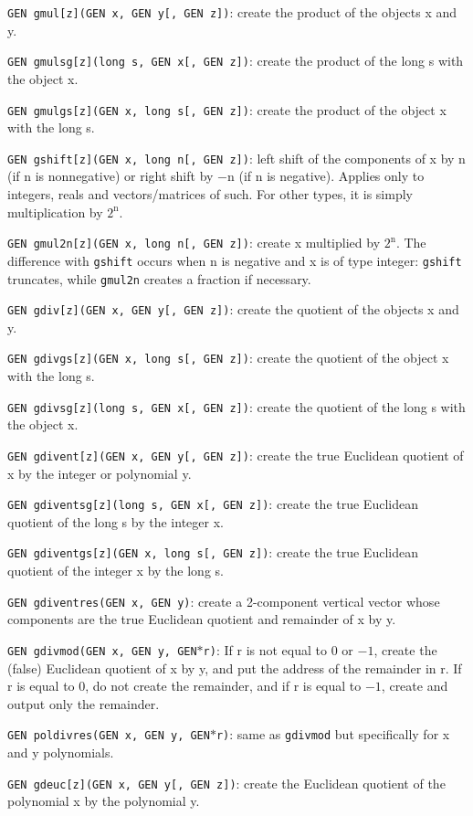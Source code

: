 {\tt GEN gmul[z](GEN x, GEN y[, GEN z])}: create the product of the objects x 
and y.

{\tt GEN gmulsg[z](long s, GEN x[, GEN z])}: create the product of the long s 
with the object x.

{\tt GEN gmulgs[z](GEN x, long s[, GEN z])}: create the product of the object
x with the long s.

{\tt GEN gshift[z](GEN x, long n[, GEN z])}: left shift of the components of
x by n (if n is nonnegative) or right shift by $-$n (if n is negative). Applies
only to integers, reals and vectors/matrices of such. For other types, it is 
simply multiplication by $2^{\text{n}}$.

{\tt GEN gmul2n[z](GEN x, long n[, GEN z])}: create x multiplied by 
$2^{\text{n}}$. The difference with {\tt gshift} occurs when n is negative and
x is of type integer: {\tt gshift} truncates, while {\tt gmul2n} creates a
fraction if necessary.

{\tt GEN gdiv[z](GEN x, GEN y[, GEN z])}: create the quotient of the objects 
x and y.

{\tt GEN gdivgs[z](GEN x, long s[, GEN z])}: create the quotient of the object
x with the long s.

{\tt GEN gdivsg[z](long s, GEN x[, GEN z])}: create the quotient of the long s
with the object x.

{\tt GEN gdivent[z](GEN x, GEN y[, GEN z])}: create the true Euclidean 
quotient of x by the integer or polynomial y.

{\tt GEN gdiventsg[z](long s, GEN x[, GEN z])}: create the true Euclidean 
quotient of the long s by the integer x.

{\tt GEN gdiventgs[z](GEN x, long s[, GEN z])}: create the true Euclidean 
quotient of the integer x by the long s.

{\tt GEN gdiventres(GEN x, GEN y)}: create a 2-component vertical vector whose
components are the true Euclidean quotient and remainder of x by y.

{\tt GEN gdivmod(GEN x, GEN y, GEN$*$r)}: If r is not equal to 0 or $-1$,
create the (false) Euclidean quotient of x by y, and put the address of the 
remainder in r. If r is equal to 0, do not create the remainder, and if r is
equal to $-1$, create and output only the remainder.

{\tt GEN poldivres(GEN x, GEN y, GEN$*$r)}: same as {\tt gdivmod} but
specifically for x and y polynomials.

{\tt GEN gdeuc[z](GEN x, GEN y[, GEN z])}: create the Euclidean quotient of 
the polynomial x by the polynomial y.

